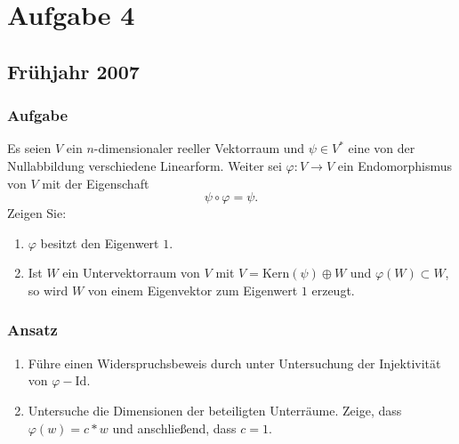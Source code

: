 \chapter{Aufgabe 4}

\section{Frühjahr 2007}

\subsection{Aufgabe}
Es seien \( V \) ein \( n \)-dimensionaler reeller Vektorraum und \( \psi \in V^\ast \) eine von der Nullabbildung verschiedene Linearform. Weiter sei \( \varphi: V \to V \) ein Endomorphismus von \( V \) mit der Eigenschaft
\begin{equation*}
	\psi \circ \varphi = \psi\text{.}
\end{equation*}
Zeigen Sie:
\begin{enumerate}
	\item \( \varphi \) besitzt den Eigenwert \( 1 \).
	\item Ist \( W \) ein Untervektorraum von \( V \) mit \( V = \text{Kern}(\psi) \oplus W \) und \( \varphi(W) \subset W \), so wird \( W \) von einem Eigenvektor zum Eigenwert \( 1 \) erzeugt. 
\end{enumerate}

\subsection{Ansatz}
\begin{enumerate}
	\item Führe einen Widerspruchsbeweis durch unter Untersuchung der Injektivität von \( \varphi - \text{Id} \).
	\item Untersuche die Dimensionen der beteiligten Unterräume. Zeige, dass \( \varphi(w) = c*w \) und anschließend, dass \( c=1 \). 
\end{enumerate}

